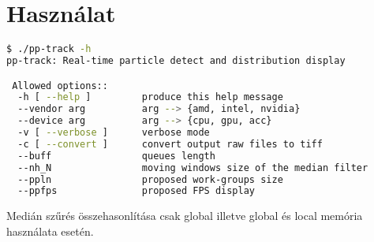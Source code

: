 \section{Használat}
\begin{lstlisting}[language=bash]
$ ./pp-track -h
pp-track: Real-time particle detect and distribution display

 Allowed options::
  -h [ --help ]         produce this help message
  --vendor arg          arg --> {amd, intel, nvidia}
  --device arg          arg --> {cpu, gpu, acc}
  -v [ --verbose ]      verbose mode
  -c [ --convert ]      convert output raw files to tiff
  --buff                queues length
  --nh_N                moving windows size of the median filter
  --ppln                proposed work-groups size
  --ppfps               proposed FPS display 
\end{lstlisting}
Medián szűrés összehasonlítása csak global illetve global és local memória használata esetén.
